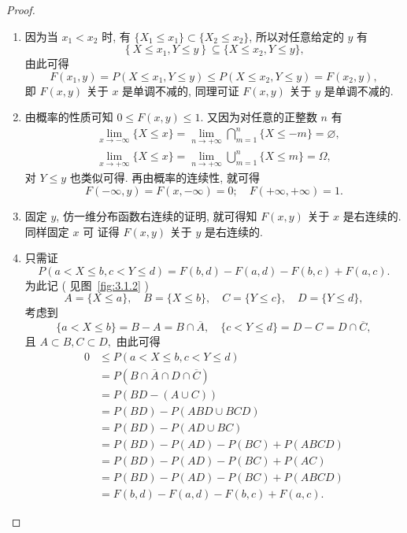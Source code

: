    \begin{proof}
    	\begin{enumerate}
    		\item  因为当 $x_1<x_2$ 时, 有 $\{X_1\leq x_1\} \subset \{X_2 \leq x_2\}$, 所以对任意给定的 $y$ 有
    		\[
    			\left\{X \leq x_{1}, Y \leq y\right\} \subseteq \{ X \leq x_{2}, Y \leq y \},
    		\]
    		由此可得
    		\[
    			F\left(x_{1}, y\right)=P\left(X \leq x_{1}, Y \leq y\right) \leq
    			P\left(X \leq x_{2}, Y \leq y\right)=F\left(x_{2}, y\right),
    		\]
    		即 $F(x,y)$ 关于 $x$ 是单调不减的, 同理可证 $F(x,y)$ 关于 $y$ 是单调不减的.
    		\item 由概率的性质可知 $0\leq F(x,y) \leq 1$. 又因为对任意的正整数 $n$ 有
    		\begin{align*}
    			&\lim_{x\to -\infty}\{X\leq x\}=\lim_{n\to +\infty}\bigcap_{m=1}^n \{X\leq -m\}=\varnothing,	\\
    			&\lim_{x\to +\infty}\{X\leq x\}=\lim_{n\to +\infty}\bigcup_{m=1}^n\{X\leq m\}=\Omega,
    		\end{align*}
    		对 $Y \leq y$ 也类似可得. 再由概率的连续性, 就可得
    		\[
    		 	F(-\infty, y)=F(x,-\infty)=0; \quad F(+\infty,+\infty)=1.
    		\]
    		\item 固定 $y$, 仿一维分布函数右连续的证明, 就可得知 $F(x, y)$ 关于 $x$ 是右连续的. 同样固定 $x$ 可
    		证得 $F(x,y)$ 关于 $y$ 是右连续的.
        	\item 只需证
        	\[
        	 	P(a<X \leq b, c<Y \leq d)=F(b, d)-F(a, d)-F(b, c)+F(a, c).
        	\]
        	为此记 ( 见图~\ref{fig:3.1.2} )
        	\[
        	 	A=\{X \leqslant a\}, \quad B=\{ X \leqslant b \}, \quad C=\{Y \leqslant c\}, \quad D=\{Y \leqslant d\},
        	\]
        	考虑到
        	\[
        	 	\{ a<X \leqslant b \}=B-A=B \cap \overline{A}, \quad\{c<Y \leqslant d\}=D-C=D \cap \overline{C},
        	\]
        	且 $A \subset B, C\subset D,$ 由此可得
        	\begin{align*}
        		 0 & \leqslant P(a<X \leqslant b, c<Y \leqslant d) \\
        		 &=P(B \cap \overline{A} \cap D \cap \overline{C}) \\
        		 &=P(B D-(A \cup C)) \\
        		 &=P(B D)-P(A B D \cup B C D) \\
        		 &=P(B D)-P(A D \cup B C) \\
        		 &=P(B D)-P(A D)-P(B C)+P(A B C D) \\
        		 &=P(B D)-P(A D)-P(B C)+P(A C ) \\
        		 &=P(B D)-P(A D)-P(B C)+P(A B C D) \\
        		 &=F(b, d)-F(a, d)-F(b, c)+F(a, c).
        	\end{align*}
    	\end{enumerate}
    \end{proof}

